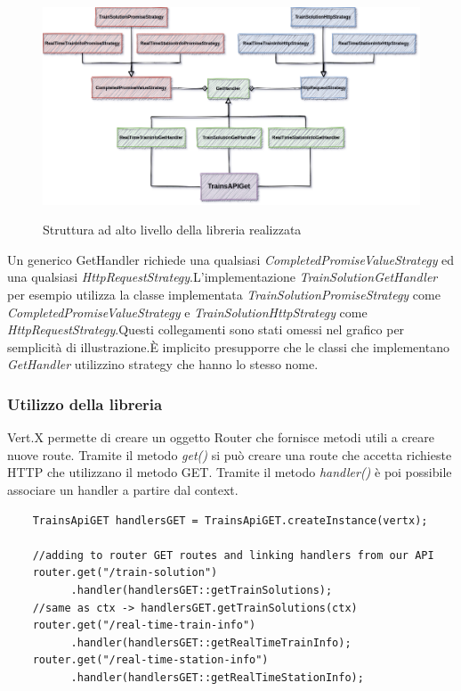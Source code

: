 \begin{figure}[H]
    \caption{Struttura ad alto livello della libreria realizzata}
    \centering
    \includegraphics[width=160mm]{img/uml_2.png}
    \label{fig:uml_library}
\end{figure}

\begin{warn}
Un generico GetHandler richiede una qualsiasi \textit{CompletedPromiseValueStrategy} ed una qualsiasi \textit{HttpRequestStrategy}.\newline L'implementazione \textit{TrainSolutionGetHandler} per esempio utilizza la classe implementata \textit{TrainSolutionPromiseStrategy} come \textit{CompletedPromiseValueStrategy} e  \textit{TrainSolutionHttpStrategy} come \textit{HttpRequestStrategy}.\newline Questi collegamenti sono stati omessi nel grafico per semplicità di illustrazione.\newline È implicito presupporre che le classi che implementano \textit{GetHandler} utilizzino strategy che hanno lo stesso nome.
\end{warn}

\subsubsection{Utilizzo della libreria}
Vert.X permette di creare un oggetto Router che fornisce metodi utili a creare nuove route. Tramite il metodo \textit{get()} si può creare una route che accetta richieste HTTP che utilizzano il metodo GET. Tramite il metodo \textit{handler()} è poi possibile associare un handler a partire dal context.
\begin{verbatim}
    TrainsApiGET handlersGET = TrainsApiGET.createInstance(vertx);

    //adding to router GET routes and linking handlers from our API
    router.get("/train-solution")
          .handler(handlersGET::getTrainSolutions);
    //same as ctx -> handlersGET.getTrainSolutions(ctx)
    router.get("/real-time-train-info")
          .handler(handlersGET::getRealTimeTrainInfo);
    router.get("/real-time-station-info")
          .handler(handlersGET::getRealTimeStationInfo);
\end{verbatim}
